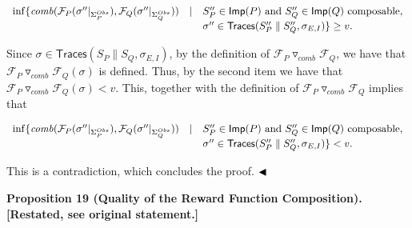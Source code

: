 \documentclass[10pt,a4paper]{article}
\begin{document}
\par  \quad  \[\begin{array}[]{lll}\inf\{\mathit{comb}(\mathcal{F}_{P}(\sigma^{\prime\prime}|_{\Sigma_{P}^{Obs}}),\mathcal{F}_{Q}(\sigma^{\prime\prime}|_{\Sigma_{Q}^{Obs}}))&\mid&S_{P}^{\prime\prime}\in\mathsf{Imp}(P)\text{ and }S_{Q}^{\prime\prime}\in\mathsf{Imp}(Q)\text{ composable},\\
&&\sigma^{\prime\prime}\in\mathsf{Traces}(S_{P}^{\prime\prime}\parallel S_{Q}^{\prime\prime},\sigma_{E,I})\}\geq v.\end{array}\]\quad  \quad  
  
 
 
Since $\sigma\in\mathsf{Traces}(S_{P}\parallel S_{Q},\sigma_{E,I})$, by the definition of ${{\mathcal{F}_{P}}\mathbin{\triangledown_{\mathit{comb}}}{\mathcal{F}_{Q}}}$, we have that ${{\mathcal{F}_{P}}\mathbin{\triangledown_{\mathit{comb}}}{\mathcal{F}_{Q}}}(\sigma)$ is defined. Thus, by the second item we have that ${{\mathcal{F}_{P}}\mathbin{\triangledown_{\mathit{comb}}}{\mathcal{F}_{Q}}}(\sigma)<v$. This, together with the definition of ${{\mathcal{F}_{P}}\mathbin{\triangledown_{\mathit{comb}}}{\mathcal{F}_{Q}}}$ implies that\par
  
\par  \quad  \[\begin{array}[]{lll}\inf\{\mathit{comb}(\mathcal{F}_{P}(\sigma^{\prime\prime}|_{\Sigma_{P}^{Obs}}),\mathcal{F}_{Q}(\sigma^{\prime\prime}|_{\Sigma_{Q}^{Obs}}))&\mid&S_{P}^{\prime\prime}\in\mathsf{Imp}(P)\text{ and }S_{Q}^{\prime\prime}\in\mathsf{Imp}(Q)\text{ composable},\\
&&\sigma^{\prime\prime}\in\mathsf{Traces}(S_{P}^{\prime\prime}\parallel S_{Q}^{\prime\prime},\sigma_{E,I})\}<v.\end{array}\]\quad  \quad  
  
This is a contradiction, which concludes the proof. $\hfill\blacktriangleleft$\par
 
 
 
 
\par\medskip\noindent\textbf{Proposition 19 (Quality of the Reward Function Composition). [Restated, see original statement.]}\par
 
\end{document}
